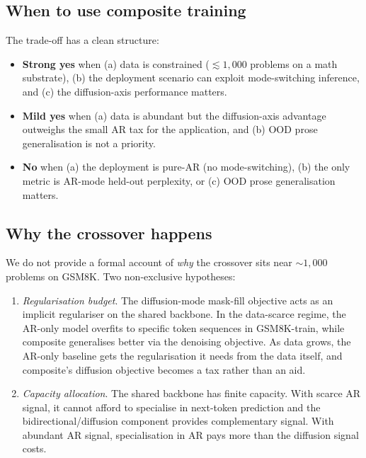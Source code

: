 \subsection{When to use composite training}

The trade-off has a clean structure:

\begin{itemize}
  \item \textbf{Strong yes} when (a) data is constrained
        ($\lesssim 1{,}000$ problems on a math substrate), (b) the
        deployment scenario can exploit mode-switching inference, and
        (c) the diffusion-axis performance matters.
  \item \textbf{Mild yes} when (a) data is abundant but the
        diffusion-axis advantage outweighs the small AR tax for the
        application, and (b) OOD prose generalisation is not a
        priority.
  \item \textbf{No} when (a) the deployment is pure-AR (no
        mode-switching), (b) the only metric is AR-mode held-out
        perplexity, or (c) OOD prose generalisation matters.
\end{itemize}

\subsection{Why the crossover happens}

We do not provide a formal account of \emph{why} the crossover sits
near $\sim 1{,}000$ problems on GSM8K. Two non-exclusive hypotheses:

\begin{enumerate}
  \item \emph{Regularisation budget}. The diffusion-mode mask-fill
        objective acts as an implicit regulariser on the shared
        backbone. In the data-scarce regime, the AR-only model
        overfits to specific token sequences in GSM8K-train, while
        composite generalises better via the denoising objective. As
        data grows, the AR-only baseline gets the regularisation it
        needs from the data itself, and composite's diffusion
        objective becomes a tax rather than an aid.
  \item \emph{Capacity allocation}. The shared backbone has finite
        capacity. With scarce AR signal, it cannot afford to specialise
        in next-token prediction and the bidirectional/diffusion
        component provides complementary signal. With abundant AR
        signal, specialisation in AR pays more than the diffusion
        signal costs.
\end{enumerate}

